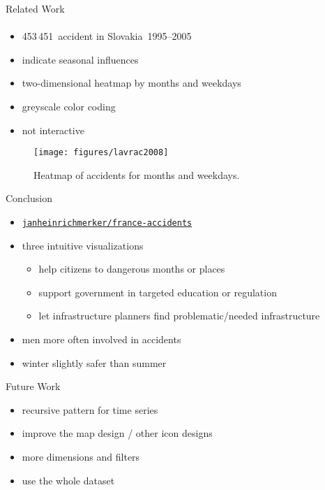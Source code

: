 \documentclass[english]{mlutalk}
\begin{document}
\begin{frame}{Related Work}
  \framesubtitle{\textcite{LavravcJTK2008}}
  \begin{itemize}
    \item 453\,451~accident in Slovakia~1995--2005
    \item indicate seasonal influences
    \item two-dimensional heatmap by months and weekdays
    \item greyscale color coding
    \item not interactive
  \end{itemize}
  \begin{figure}
    \centering
    \texttt{[image: figures/lavrac2008]}
    \caption{Heatmap of accidents for months and weekdays.~\cite{LavravcJTK2008}}
  \end{figure}
\end{frame}

\begin{frame}{Conclusion}
  \begin{itemize}
    \item[\faIcon{github}] \href{https://github.com/janheinrichmerker/france-accidents}{\texttt{janheinrichmerker/france-accidents}}
    \item three intuitive visualizations
    \begin{itemize}
      \item help citizens to dangerous months or places
      \item support government in targeted education or regulation
      \item let infrastructure planners find problematic/needed infrastructure
    \end{itemize}
    \item men more often involved in accidents
    \item winter slightly safer than summer
  \end{itemize}
  \vspace{1ex}
  \begin{block}{Future Work}
    \begin{itemize}
      \item recursive pattern for time series
      \item improve the map design / other icon designs
      \item more dimensions and filters
      \item use the whole dataset
    \end{itemize}
  \end{block}
  \thankyou
\end{frame}

\appendix
\section{\appendixname}

\bibliographyframe
\end{document}
